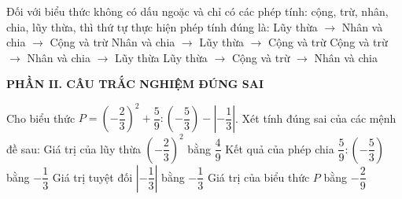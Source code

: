 \documentclass[12pt,a4paper]{article}
\begin{document}
\begin{ex}
Đối với biểu thức không có dấu ngoặc và chỉ có các phép tính: cộng, trừ, nhân, chia, lũy thừa, thì thứ tự thực hiện phép tính đúng là:
\choice
{\True Lũy thừa $\to$ Nhân và chia $\to$ Cộng và trừ}
{Nhân và chia $\to$ Lũy thừa $\to$ Cộng và trừ}
{Cộng và trừ $\to$ Nhân và chia $\to$ Lũy thừa}
{Lũy thừa $\to$ Cộng và trừ $\to$ Nhân và chia}
\end{ex}


\setcounter{ex}{0}
\noindent\textbf{\large PHẦN II. CÂU TRẮC NGHIỆM ĐÚNG SAI}

\vspace{1mm}
\begin{ex}
Cho biểu thức $P = \left(-\dfrac{2}{3}\right)^2 + \dfrac{5}{9} : \left(-\dfrac{5}{3}\right) - \left|-\dfrac{1}{3}\right|$. Xét tính đúng sai của các mệnh đề sau:
\choiceTF
{\True Giá trị của lũy thừa $\left(-\dfrac{2}{3}\right)^2$ bằng $\dfrac{4}{9}$}
{\True Kết quả của phép chia $\dfrac{5}{9} : \left(-\dfrac{5}{3}\right)$ bằng $-\dfrac{1}{3}$}
{Giá trị tuyệt đối $\left|-\dfrac{1}{3}\right|$ bằng $-\dfrac{1}{3}$}
{\True Giá trị của biểu thức $P$ bằng $-\dfrac{2}{9}$}
\end{ex}
\end{document}
